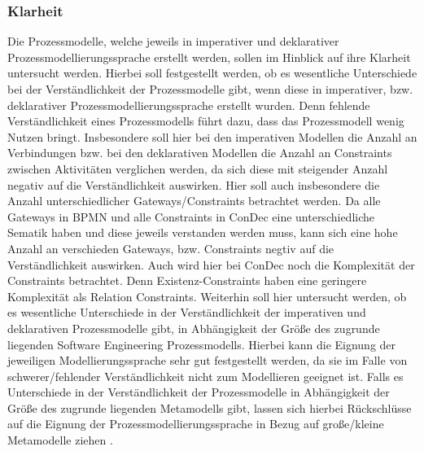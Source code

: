 \subsubsection{Klarheit}
Die Prozessmodelle, welche jeweils in imperativer und deklarativer Prozessmodellierungssprache erstellt werden, sollen im Hinblick auf ihre Klarheit untersucht werden. Hierbei soll festgestellt werden, ob es wesentliche Unterschiede bei der Verständlichkeit der Prozessmodelle gibt, wenn diese in imperativer, bzw. deklarativer Prozessmodellierungssprache erstellt wurden. Denn fehlende Verständlichkeit eines Prozessmodells führt dazu, dass das Prozessmodell wenig Nutzen bringt. Insbesondere soll hier bei den imperativen Modellen die Anzahl an Verbindungen bzw. bei den deklarativen Modellen die Anzahl an Constraints zwischen Aktivitäten verglichen werden, da sich diese mit steigender Anzahl negativ auf die Verständlichkeit auswirken.\newline
Hier soll auch insbesondere die Anzahl unterschiedlicher Gateways/Constraints betrachtet werden.  Da alle Gateways in BPMN und alle Constraints in ConDec eine unterschiedliche Sematik haben und diese jeweils verstanden werden muss, kann sich eine hohe Anzahl an verschieden Gateways, bzw. Constraints negtiv auf die Verständlichkeit auswirken. Auch wird hier bei ConDec noch die Komplexität der Constraints betrachtet. Denn Existenz-Constraints haben eine geringere Komplexität als Relation Constraints.\newline
Weiterhin soll hier untersucht werden, ob es wesentliche Unterschiede in der Verständlichkeit der imperativen und deklarativen Prozessmodelle gibt, in Abhängigkeit der Größe des zugrunde liegenden Software Engineering Prozessmodells. Hierbei kann die Eignung der jeweiligen Modellierungssprache sehr gut festgestellt werden, da sie im Falle von schwerer/fehlender Verständlichkeit nicht zum Modellieren geeignet ist. Falls es Unterschiede in der Verständlichkeit der Prozessmodelle in Abhängigkeit der Größe des zugrunde liegenden Metamodells gibt, lassen sich hierbei Rückschlüsse auf die Eignung der Prozessmodellierungssprache in Bezug auf große/kleine Metamodelle ziehen \cite{leimeister2012,journals95, freund2007,reinshagen2009, becker2012prozessmanagement,koch2011,bpm07,thesis_maja}.


